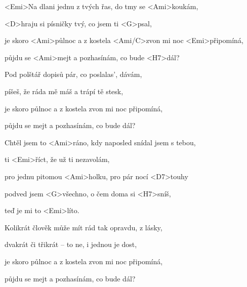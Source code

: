 

\zs
<Emi>Na dlani jednu z tvých řas, do tmy se <Ami>koukám,

<D>hraju si písničky tvý, co jsem ti <G>psal,

je skoro <Ami>půlnoc a z kostela <Ami/C>zvon mi noc <Emi>připomíná,

půjdu se <Ami>mejt a pozhasínám, co bude <H7>dál?
\ks

\zs
Pod polštář dopisů pár, co poslalas', dávám,

píšeš, že ráda mě máš a trápí tě stesk,

je skoro půlnoc a z kostela zvon mi noc připomíná,

půjdu se mejt a pozhasínám, co bude dál?
\ks

\zr
Chtěl jsem to <Ami>ráno, kdy naposled snídal jsem s tebou,

ti <Emi>říct, že už ti nezavolám,

pro jednu pitomou <Ami>holku, pro pár nocí <D7>touhy

podved jsem <G>všechno, o čem doma si <H7>sníš,

teď je mi to <Emi>líto.
\kr

\zs
Kolikrát člověk může mít rád tak opravdu, z lásky,

dvakrát či třikrát -- to ne, i jednou je dost,

je skoro půlnoc a z kostela zvon mi noc připomíná,

půjdu se mejt a pozhasínám, co bude dál?
\ks


\zr \kr

\kp






